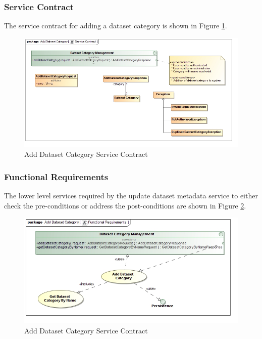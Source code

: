 \subsubsection{Service Contract}
The service contract for adding a dataset category is shown in 
Figure \ref{fig:addDatasetCategoryServiceContract}.
\begin{figure}[H]
  \begin{center}
  \includegraphics[scale=0.38]{../Diagrams and Charts/Repository Management/Add Dataset Category Service Contract.jpg}
  \caption{Add Dataset Category Service Contract}
  \label{fig:addDatasetCategoryServiceContract}
  \end{center}
\end{figure}

\subsubsection{Functional Requirements}
The lower level services required by the update dataset metadata service to
either check the pre-conditions or address the post-conditions are shown in 
Figure \ref{fig:addDatasetCategoryFunctionalRequirements}.
\begin{figure}[H]
  \begin{center}
  \includegraphics[scale=0.38]{../Diagrams and Charts/Repository Management/Add Dataset Category Functional Requirements.jpg}
  \caption{Add Dataset Category Service Contract}
  \label{fig:addDatasetCategoryFunctionalRequirements}
  \end{center}
\end{figure}




